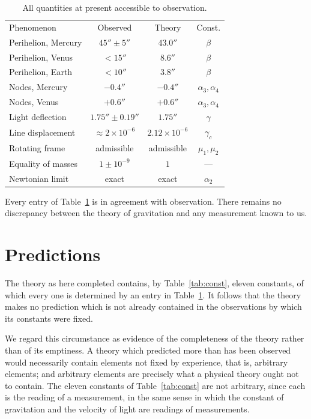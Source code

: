 \documentclass[aps,prd,reprint,amsmath,amssymb,nofootinbib,longbibliography]{revtex4-2}
\begin{document}
\begin{table}[t]
\caption{All quantities at present accessible to observation.}
\label{tab:obs}
\begin{ruledtabular}
\begin{tabular}{lccc}
Phenomenon & Observed & Theory & Const. \\
\colrule
Perihelion, Mercury & $45'' \pm 5''$ & $43.0''$ & $\beta$ \\
Perihelion, Venus & $< 15''$ & $8.6''$ & $\beta$ \\
Perihelion, Earth & $< 10''$ & $3.8''$ & $\beta$ \\
Nodes, Mercury & $-0.4''$ & $-0.4''$ & $\alpha_3,\alpha_4$ \\
Nodes, Venus & $+0.6''$ & $+0.6''$ & $\alpha_3,\alpha_4$ \\
Light deflection & $1.75'' \pm 0.19''$ & $1.75''$ & $\gamma$ \\
Line displacement & $\approx 2\times 10^{-6}$ & $2.12\times 10^{-6}$ & $\gamma_c$ \\
Rotating frame & admissible & admissible & $\mu_1,\mu_2$ \\
Equality of masses & $1 \pm 10^{-9}$ & $1$ & --- \\
Newtonian limit & exact & exact & $\alpha_2$ \\
\end{tabular}
\end{ruledtabular}
\end{table}

Every entry of Table~\ref{tab:obs} is in agreement with observation. There remains no discrepancy
between the theory of gravitation and any measurement known to us.

\section{Predictions}

The theory as here completed contains, by Table~\ref{tab:const}, eleven constants, of which every
one is determined by an entry in Table~\ref{tab:obs}. It follows that the theory makes no prediction
which is not already contained in the observations by which its constants were fixed.

We regard this circumstance as evidence of the completeness of the theory rather than of its
emptiness. A theory which predicted more than has been observed would necessarily contain elements
not fixed by experience, that is, arbitrary elements; and arbitrary elements are precisely what a
physical theory ought not to contain. The eleven constants of Table~\ref{tab:const} are not
arbitrary, since each is the reading of a measurement, in the same sense in which the constant of
gravitation and the velocity of light are readings of measurements.
\end{document}
